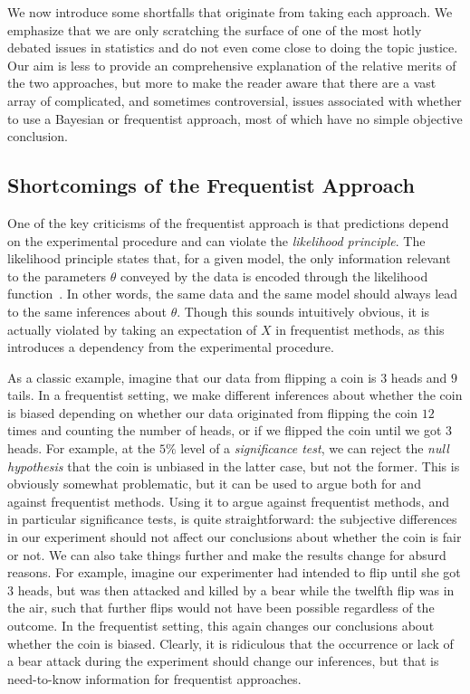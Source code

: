 We now introduce some shortfalls that originate from taking each approach.  We emphasize that we are only
scratching the surface of one of the most hotly debated issues in statistics and do not even come close to doing
the topic justice.  Our aim is less to provide an comprehensive explanation of the relative merits of the two approaches, but
more to make the reader aware that there are a vast array of complicated, and sometimes controversial,
issues associated with whether to use a Bayesian or
frequentist approach, most of which have no simple objective conclusion.


\subsection{Shortcomings of the Frequentist Approach}
\label{sec:bayes:religion:freq}

One of the key criticisms of the frequentist approach is that predictions depend on the experimental procedure and
can violate the \emph{likelihood principle}.  The likelihood principle states that, for a given model, 
the only information relevant
to the parameters $\theta$ conveyed by the data is encoded through the likelihood function~\citep{robert2007bayesian}.  
In other words, the same data and 
the same model should always lead to the same inferences about $\theta$.  Though this sounds intuitively obvious, it is actually violated by
taking an expectation of $X$ in frequentist methods, as this introduces a dependency from the experimental procedure.

As a classic example, 
imagine that our data from flipping a coin is $3$ heads and $9$ tails.
In a frequentist setting, we make different inferences about whether the coin is biased 
depending on whether our data originated from flipping the coin $12$ times and counting the number of heads, or if we 
flipped the coin until we got $3$ heads.  For example, at the $5\%$ level of a \emph{significance test}, we can reject the \emph{null
hypothesis} that the coin is unbiased in the latter case, but not the former.  This is obviously somewhat problematic, but it
can be used to argue both for and against frequentist methods.  Using it
to argue against frequentist methods, and in particular significance tests, is quite straightforward: the subjective
differences in our experiment should not affect our conclusions about whether the coin is fair or not.  We can also take things
further and make the results change for absurd reasons.  For example, imagine our experimenter had intended to flip until she got
$3$ heads, but was then attacked and killed by a bear while the twelfth flip was in the air, such that further flips would not
have been possible regardless of the outcome.  In the frequentist setting, this again changes our conclusions
about whether the coin is biased.  Clearly, it is ridiculous that the occurrence or lack of a bear attack during the experiment
should change our inferences, but that is need-to-know information for frequentist approaches.


